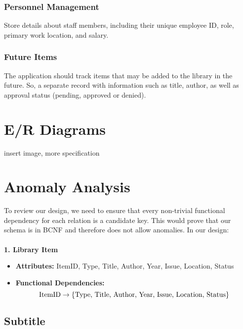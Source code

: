 \documentclass[11pt,a4paper]{article}
\begin{document}
\subsubsection{Personnel Management}

Store details about staff members, including their unique employee ID, role, primary work location, and salary.

\subsubsection{Future Items}

The application should track items that may be added to the library in the future. So, a separate record with information such as title, author, as well as approval status (pending, approved or denied).

\section{E/R Diagrams}

insert image, more specification

\section{Anomaly Analysis}

To review our design, we need to ensure that every non-trivial functional dependency for each relation is a candidate key. This would prove that our schema is in BCNF and therefore does not allow anomalies. In our design: \\ \\ \textbf{1. Library Item}

\begin{itemize}
    \item{\textbf{Attributes: } ItemID, Type, Title, Author, Year, Issue, Location, Status}
    \item{\textbf{Functional Dependencies: } \begin{equation}
        \text{ItemID} \rightarrow \{\text{Type, Title, Author, Year, Issue, Location, Status}\}\\
        \text{}
    \end{equation}}
\end{itemize}






\subsection*{Subtitle}
\lipsum[4-5]
\end{document}
